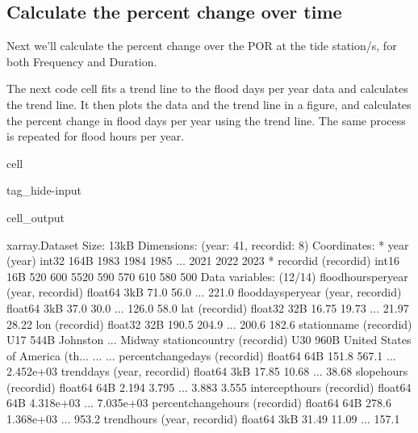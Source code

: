 \documentclass[letterpaper,10pt,english]{jupyterBook}
\begin{document}
\subsection{Calculate the percent change over time}
\label{\detokenize{notebooks/FloodFrequency:calculate-the-percent-change-over-time}}
\sphinxAtStartPar
Next we’ll calculate the percent change over the POR at the tide station/s, for both Frequency and Duration.

\sphinxAtStartPar
The next code cell fits a trend line to the flood days per year data and calculates the trend line.
It then plots the data and the trend line in a figure, and calculates the percent change in flood days per year using the trend line. The same process is repeated for flood hours per year.

\begin{sphinxuseclass}{cell}
\begin{sphinxuseclass}{tag_hide-input}\begin{sphinxVerbatimOutput}

\begin{sphinxuseclass}{cell_output}
\begin{sphinxVerbatim}[commandchars=\\\{\}]
\PYGZlt{}xarray.Dataset\PYGZgt{} Size: 13kB
Dimensions:               (year: 41, record\PYGZus{}id: 8)
Coordinates:
  * year                  (year) int32 164B 1983 1984 1985 ... 2021 2022 2023
  * record\PYGZus{}id             (record\PYGZus{}id) int16 16B 520 600 5520 590 570 610 580 500
Data variables: (12/14)
    flood\PYGZus{}hours\PYGZus{}per\PYGZus{}year  (year, record\PYGZus{}id) float64 3kB 71.0 56.0 ... 221.0
    flood\PYGZus{}days\PYGZus{}per\PYGZus{}year   (year, record\PYGZus{}id) float64 3kB 37.0 30.0 ... 126.0 58.0
    lat                   (record\PYGZus{}id) float32 32B 16.75 19.73 ... 21.97 28.22
    lon                   (record\PYGZus{}id) float32 32B 190.5 204.9 ... 200.6 182.6
    station\PYGZus{}name          (record\PYGZus{}id) \PYGZlt{}U17 544B \PYGZsq{}Johnston\PYGZsq{} ... \PYGZsq{}Midway\PYGZsq{}
    station\PYGZus{}country       (record\PYGZus{}id) \PYGZlt{}U30 960B \PYGZsq{}United States of America (th...
    ...                    ...
    percent\PYGZus{}change\PYGZus{}days   (record\PYGZus{}id) float64 64B 151.8 567.1 ... 2.452e+03
    trend\PYGZus{}days            (year, record\PYGZus{}id) float64 3kB 17.85 10.68 ... 38.68
    slope\PYGZus{}hours           (record\PYGZus{}id) float64 64B 2.194 3.795 ... 3.883 3.555
    intercept\PYGZus{}hours       (record\PYGZus{}id) float64 64B \PYGZhy{}4.318e+03 ... \PYGZhy{}7.035e+03
    percent\PYGZus{}change\PYGZus{}hours  (record\PYGZus{}id) float64 64B 278.6 1.368e+03 ... 953.2
    trend\PYGZus{}hours           (year, record\PYGZus{}id) float64 3kB 31.49 11.09 ... 157.1
\end{sphinxVerbatim}

\end{sphinxuseclass}\end{sphinxVerbatimOutput}

\end{sphinxuseclass}
\end{sphinxuseclass}
\end{document}
